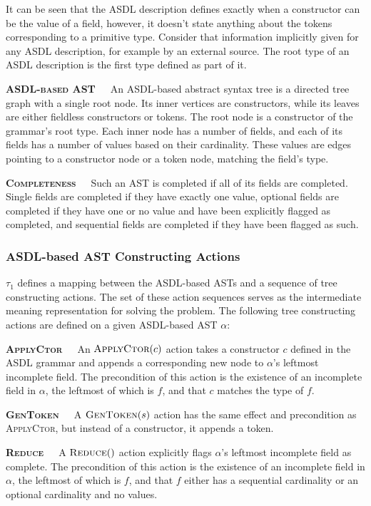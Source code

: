 \noindent
It can be seen that the ASDL description defines exactly when a constructor can be
the value of a field, however, it doesn't state anything about the tokens corresponding
to a primitive type. Consider that information implicitly given for any ASDL
description, for example by an external source. The root type of an ASDL
description is the first type defined as part of it.

\textbf{\textsc{ASDL-based AST}}\ \ \ An ASDL-based abstract syntax tree is a
directed tree graph with a single root node. Its inner vertices are constructors,
while its leaves are either fieldless constructors or tokens. The root node is a
constructor of the grammar's root type. Each inner node has a number of fields,
and each of its fields has a number of values based on their cardinality.
These values are edges pointing to a constructor node or a token node,
matching the field's type.

\textbf{\textsc{Completeness}}\ \ \ Such an AST is completed if all of its fields
are completed. Single fields are completed if they have exactly one value,
optional fields are completed if they have one or no value and have been
explicitly flagged as completed, and sequential fields are completed if
they have been flagged as such. %

\subsubsection{ASDL-based AST Constructing Actions}

\(\tau_{1}\) defines a mapping between the ASDL-based ASTs  and
a sequence of tree constructing actions. The set of these action
sequences serves as the intermediate meaning representation
for solving the problem. The following tree constructing actions
are defined on a given ASDL-based AST \(\alpha\):

\textbf{\textsc{ApplyCtor}}\ \ \ An \(\textsc{ApplyCtor}(c)\) action takes
a constructor \(c\) defined in the ASDL grammar and appends a corresponding
new node to \(\alpha\)'s leftmost incomplete field. The precondition of this
action is the existence of an incomplete field in \(\alpha\), the leftmost
of which is \(f\), and that \(c\) matches the type of \(f\).

\textbf{\textsc{GenToken}}\ \ \ A \(\textsc{GenToken}(s)\) action has the
same effect and precondition as \textsc{ApplyCtor}, but instead of a
constructor, it appends a token.

\textbf{\textsc{Reduce}}\ \ \ A \(\textsc{Reduce}()\) action explicitly
flags \(\alpha\)'s leftmost incomplete field as complete. The precondition
of this action is the existence of an incomplete field in \(\alpha\),
the leftmost of which is \(f\), and that \(f\) either has a sequential
cardinality or an optional cardinality and no values.

